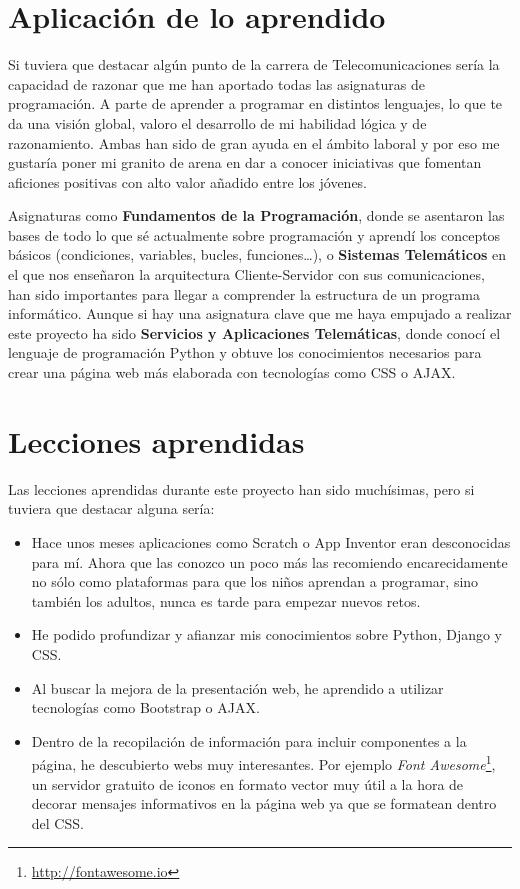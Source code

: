 \documentclass[a4paper, 12pt]{book}
\begin{document}
\section{Aplicación de lo aprendido}
\label{sec:aplicacion}
Si tuviera que destacar algún punto de la carrera de Telecomunicaciones sería la capacidad de razonar que me han aportado todas las asignaturas de programación. A parte de aprender a programar en distintos lenguajes, lo que te da una visión global, valoro el desarrollo de mi habilidad lógica y de razonamiento. Ambas han sido de gran ayuda en el ámbito laboral y por eso me gustaría poner mi granito de arena en dar a conocer iniciativas que fomentan aficiones positivas con alto valor añadido entre los jóvenes.  

Asignaturas como \textbf{Fundamentos de la Programación}, donde se asentaron las bases de todo lo que sé actualmente sobre programación y aprendí los conceptos básicos (condiciones, variables, bucles, funciones\ldots), o \textbf{Sistemas Telemáticos} en el que nos enseñaron la arquitectura Cliente-Servidor con sus comunicaciones, han sido importantes para llegar a comprender la estructura de un programa informático. Aunque si hay una asignatura clave que me haya empujado a realizar este proyecto ha sido \textbf{Servicios y Aplicaciones Telemáticas}, donde conocí el lenguaje de programación Python y obtuve los conocimientos necesarios para crear una página web más elaborada con tecnologías como CSS o AJAX. 

\section{Lecciones aprendidas}
\label{sec:lecciones_aprendidas}
Las lecciones aprendidas durante este proyecto han sido muchísimas, pero si tuviera que destacar alguna sería:
\begin{itemize}
  \item Hace unos meses aplicaciones como Scratch o App Inventor eran desconocidas para mí. Ahora que las conozco un poco más las recomiendo encarecidamente no sólo como plataformas para que los niños aprendan a programar, sino también los adultos, nunca es tarde para empezar nuevos retos.
  \item He podido profundizar y afianzar mis conocimientos sobre Python, Django y CSS.
  \item Al buscar la mejora de la presentación web, he aprendido a utilizar tecnologías como Bootstrap o AJAX.
  \item Dentro de la recopilación de información para incluir componentes a la página, he descubierto webs muy interesantes. Por ejemplo \textit{Font Awesome}\footnote{\url{http://fontawesome.io}}, un servidor gratuito de iconos en formato vector muy útil a la hora de decorar mensajes informativos en la página web ya que se formatean dentro del CSS. 
\end{itemize}
\end{document}
